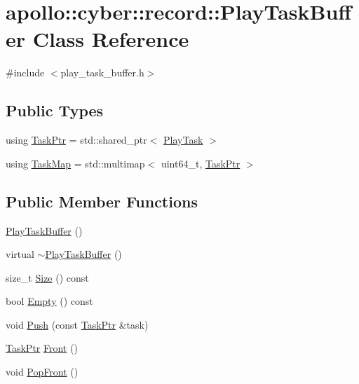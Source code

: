 \hypertarget{classapollo_1_1cyber_1_1record_1_1PlayTaskBuffer}{\section{apollo\-:\-:cyber\-:\-:record\-:\-:Play\-Task\-Buffer Class Reference}
\label{classapollo_1_1cyber_1_1record_1_1PlayTaskBuffer}
}


{\ttfamily \#include $<$play\-\_\-task\-\_\-buffer.\-h$>$}

\subsection*{Public Types}
\begin{DoxyCompactItemize}
\item 
using \hyperlink{classapollo_1_1cyber_1_1record_1_1PlayTaskBuffer_abdab9410dfa9e3ea1ff24159f2def04f}{Task\-Ptr} = std\-::shared\-\_\-ptr$<$ \hyperlink{classapollo_1_1cyber_1_1record_1_1PlayTask}{Play\-Task} $>$
\item 
using \hyperlink{classapollo_1_1cyber_1_1record_1_1PlayTaskBuffer_a86f981e02cc0d763c58afdd89b0db510}{Task\-Map} = std\-::multimap$<$ uint64\-\_\-t, \hyperlink{classapollo_1_1cyber_1_1record_1_1PlayTaskBuffer_abdab9410dfa9e3ea1ff24159f2def04f}{Task\-Ptr} $>$
\end{DoxyCompactItemize}
\subsection*{Public Member Functions}
\begin{DoxyCompactItemize}
\item 
\hyperlink{classapollo_1_1cyber_1_1record_1_1PlayTaskBuffer_a04dad02bd480aa696e9cb8f1c7df2775}{Play\-Task\-Buffer} ()
\item 
virtual \hyperlink{classapollo_1_1cyber_1_1record_1_1PlayTaskBuffer_a66a4e421a23fc3e67fd332197fa12c43}{$\sim$\-Play\-Task\-Buffer} ()
\item 
size\-\_\-t \hyperlink{classapollo_1_1cyber_1_1record_1_1PlayTaskBuffer_ac55eb5a8ce38f8d2bed2c900ac8b8b42}{Size} () const 
\item 
bool \hyperlink{classapollo_1_1cyber_1_1record_1_1PlayTaskBuffer_acc53cf6e820900208d155d4bce82467e}{Empty} () const 
\item 
void \hyperlink{classapollo_1_1cyber_1_1record_1_1PlayTaskBuffer_af25951447b2d3aaccad81200ff465280}{Push} (const \hyperlink{classapollo_1_1cyber_1_1record_1_1PlayTaskBuffer_abdab9410dfa9e3ea1ff24159f2def04f}{Task\-Ptr} \&task)
\item 
\hyperlink{classapollo_1_1cyber_1_1record_1_1PlayTaskBuffer_abdab9410dfa9e3ea1ff24159f2def04f}{Task\-Ptr} \hyperlink{classapollo_1_1cyber_1_1record_1_1PlayTaskBuffer_ab62f0719b82c466efd5f22785b4f8c22}{Front} ()
\item 
void \hyperlink{classapollo_1_1cyber_1_1record_1_1PlayTaskBuffer_ac0b92aa25c06c8ffd6f04756ea4daea9}{Pop\-Front} ()
\end{DoxyCompactItemize}
